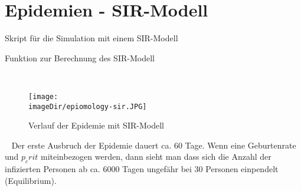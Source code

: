 \section{Epidemien - SIR-Modell}
\label{sec:epidemiology-sir-model}

\begin{code}
	\caption{Skript für die Simulation mit einem SIR-Modell}
	\label{source:epidemiology-sir-program}
\end{code}

\begin{code}
	\caption{Funktion zur Berechnung des SIR-Modell}
	\label{source:epidemiology-sir}
\end{code}
\ \newpage

\begin{figure}[h]
	\centering
	\texttt{[image: \\imageDir/epiomology-sir.JPG]}
	\caption{Verlauf der Epidemie mit SIR-Modell}
	\label{test:epidemiology-sir}
\end{figure}
\ \newline
Der erste Ausbruch der Epidemie dauert ca. 60 Tage. Wenn eine Geburtenrate und $p_crit$ miteinbezogen werden, dann sieht man dass sich die Anzahl der infizierten Personen ab ca. 6000 Tagen ungefähr bei 30 Personen einpendelt (Equilibrium).
